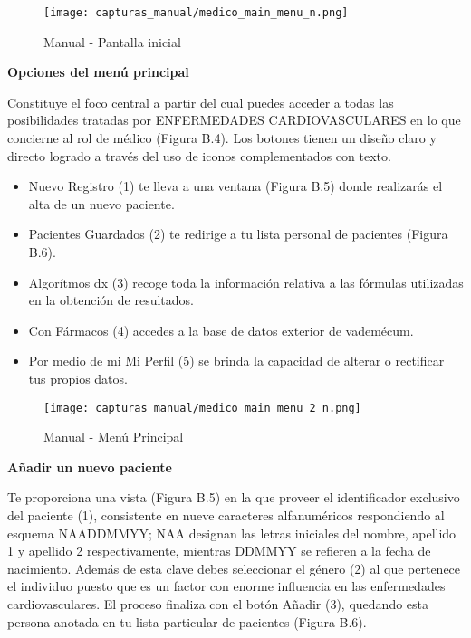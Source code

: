 \documentclass[11pt,spanish,
		listoftables,listoffigures]
		{tfgplantilla}
\begin{document}
\begin{figure}[H]
\centering
\texttt{[image: capturas\_manual/medico\_main\_menu\_n.png]}
\caption{Manual - Pantalla inicial}
\end{figure}

\textbf {Opciones del menú principal}

Constituye el foco central a partir del cual puedes acceder a todas las posibilidades tratadas por \MakeUppercase{Enfermedades Cardiovasculares} en lo que concierne al rol de médico (Figura B.4). Los botones tienen un diseño claro y directo logrado a través del uso de iconos complementados con texto. 

\begin{itemize}
	\item \textquotedbl Nuevo Registro\textquotedbl{} (1) te lleva a una ventana (Figura B.5) donde realizarás el alta de un nuevo paciente.

	\item \textquotedbl Pacientes Guardados\textquotedbl{} (2) te redirige a tu lista personal de pacientes (Figura B.6).

	\item \textquotedbl Algor\'itmos dx\textquotedbl{} (3) recoge toda la información relativa a las fórmulas utilizadas en la obtención de resultados.

	\item Con \textquotedbl Fármacos\textquotedbl{} (4) accedes a la base de datos exterior de vademécum.

	\item Por medio de mi \textquotedbl Mi Perfil\textquotedbl{} (5) se brinda la capacidad de alterar o rectificar tus propios datos.
\end{itemize}

\begin{figure}[H]
\centering
\texttt{[image: capturas\_manual/medico\_main\_menu\_2\_n.png]}
\caption{Manual - Menú Principal}
\end{figure}

\textbf {Añadir un nuevo paciente}

Te proporciona una vista (Figura B.5) en la que proveer el identificador exclusivo del paciente (1), consistente en nueve caracteres alfanuméricos respondiendo al esquema NAADDMMYY; NAA designan las letras iniciales del nombre, apellido 1 y apellido 2 respectivamente, mientras DDMMYY se refieren a la fecha de nacimiento. Además de esta clave debes seleccionar el género (2) al que pertenece el individuo puesto que es un factor con enorme influencia en las enfermedades cardiovasculares. El proceso finaliza con el botón \textquotedbl Añadir\textquotedbl{} (3), quedando esta persona anotada en tu lista particular de pacientes (Figura B.6).
\end{document}
